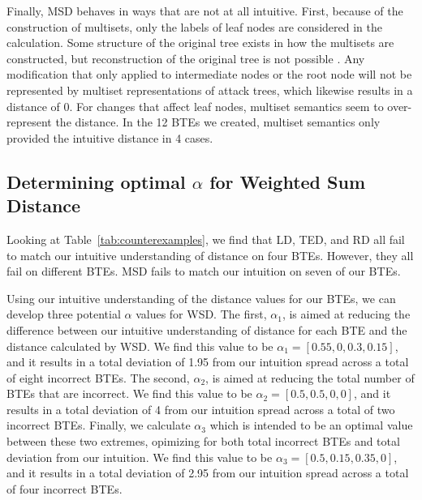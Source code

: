 Finally, MSD behaves in ways that are not at all intuitive. First, because of the construction of multisets, only the labels of leaf nodes are considered in the calculation. Some structure of the original tree exists in how the multisets are constructed, but reconstruction of the original tree is not possible \cite{mauw_foundations_2006}. Any modification that only applied to intermediate nodes or the root node will not be represented by multiset representations of attack trees, which likewise results in a distance of 0. For changes that affect leaf nodes, multiset semantics seem to over-represent the distance. In the 12 BTEs we created, multiset semantics only provided the intuitive distance in 4 cases.







\subsection{Determining optimal $\alpha$ for Weighted Sum Distance}
\label{ssec:results-alpha}


Looking at Table~\ref{tab:counterexamples}, we find that LD, TED, and RD all fail to match our intuitive understanding of distance on four BTEs. However, they all fail on different BTEs. MSD fails to match our intuition on seven of our BTEs.

Using our intuitive understanding of the distance values for our BTEs, we can develop three potential $\alpha$ values for WSD. The first, $\alpha_1$, is aimed at reducing the difference between our intuitive understanding of distance for each BTE and the distance calculated by WSD. We find this value to be $\alpha_1=[0.55, 0, 0.3, 0.15]$, and it results in a total deviation of 1.95 from our intuition spread across a total of eight incorrect BTEs. The second, $\alpha_2$, is aimed at reducing the total number of BTEs that are incorrect. We find this value to be $\alpha_2=[0.5,0.5,0,0]$, and it results in a total deviation of 4 from our intuition spread across a total of two incorrect BTEs. Finally, we calculate $\alpha_3$ which is intended to be an optimal value between these two extremes, opimizing for both total incorrect BTEs and total deviation from our intuition. We find this value to be $\alpha_3=[0.5, 0.15, 0.35, 0]$, and it results in a total deviation of 2.95 from our intuition spread across a total of four incorrect BTEs.

